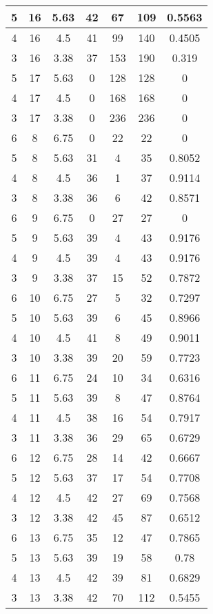 \documentclass[letterpaper, 12pt]{article}
\begin{document}
\begin{longtable}{|c|c|c|c|c|c|c|}
\hline
5 & 16 & 5.63 & 42 & 67 & 109 & 0.5563 \\
\hline
4 & 16 & 4.5 & 41 & 99 & 140 & 0.4505 \\
\hline
3 & 16 & 3.38 & 37 & 153 & 190 & 0.319 \\
\hline
5 & 17 & 5.63 & 0 & 128 & 128 & 0 \\
\hline
4 & 17 & 4.5 & 0 & 168 & 168 & 0 \\
\hline
3 & 17 & 3.38 & 0 & 236 & 236 & 0 \\
\hline
6 & 8 & 6.75 & 0 & 22 & 22 & 0 \\
\hline
5 & 8 & 5.63 & 31 & 4 & 35 & 0.8052 \\
\hline
4 & 8 & 4.5 & 36 & 1 & 37 & 0.9114 \\
\hline
3 & 8 & 3.38 & 36 & 6 & 42 & 0.8571 \\
\hline
6 & 9 & 6.75 & 0 & 27 & 27 & 0 \\
\hline
5 & 9 & 5.63 & 39 & 4 & 43 & 0.9176 \\
\hline
4 & 9 & 4.5 & 39 & 4 & 43 & 0.9176 \\
\hline
3 & 9 & 3.38 & 37 & 15 & 52 & 0.7872 \\
\hline
6 & 10 & 6.75 & 27 & 5 & 32 & 0.7297 \\
\hline
5 & 10 & 5.63 & 39 & 6 & 45 & 0.8966 \\
\hline
4 & 10 & 4.5 & 41 & 8 & 49 & 0.9011 \\
\hline
3 & 10 & 3.38 & 39 & 20 & 59 & 0.7723 \\
\hline
6 & 11 & 6.75 & 24 & 10 & 34 & 0.6316 \\
\hline
5 & 11 & 5.63 & 39 & 8 & 47 & 0.8764 \\
\hline
4 & 11 & 4.5 & 38 & 16 & 54 & 0.7917 \\
\hline
3 & 11 & 3.38 & 36 & 29 & 65 & 0.6729 \\
\hline
6 & 12 & 6.75 & 28 & 14 & 42 & 0.6667 \\
\hline
5 & 12 & 5.63 & 37 & 17 & 54 & 0.7708 \\
\hline
4 & 12 & 4.5 & 42 & 27 & 69 & 0.7568 \\
\hline
3 & 12 & 3.38 & 42 & 45 & 87 & 0.6512 \\
\hline
6 & 13 & 6.75 & 35 & 12 & 47 & 0.7865 \\
\hline
5 & 13 & 5.63 & 39 & 19 & 58 & 0.78 \\
\hline
4 & 13 & 4.5 & 42 & 39 & 81 & 0.6829 \\
\hline
3 & 13 & 3.38 & 42 & 70 & 112 & 0.5455 \\
\hline

\end{longtable}
\end{document}
